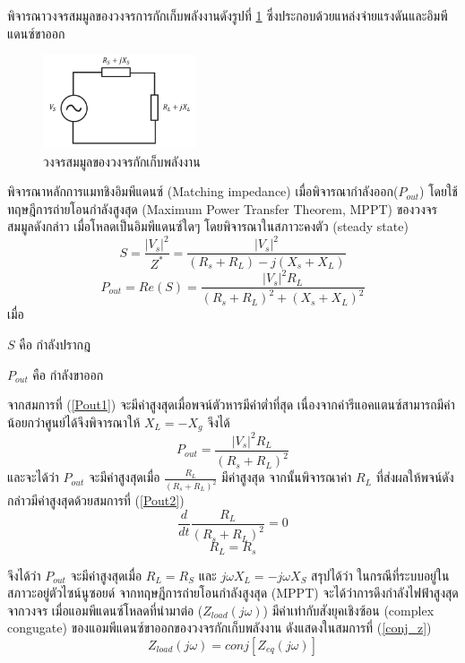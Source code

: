 \documentclass[11pt,a4paper]{article}
\begin{document}
พิจารณาวงจรสมมูลของวงจรการกักเก็บพลังงานดังรูปที่ \ref{genpath_elec_cir} ซึ่งประกอบด้วยแหล่งจ่ายแรงดันและอิมพีแดนซ์ขาออก
\begin{figure}[H]
    \begin{center}
        \includegraphics[width=0.4\textwidth]{genpath_elec_cir.jpg}
    \end{center}
    \caption{วงจรสมมูลของวงจรกักเก็บพลังงาน \cite{MPPT}}
    \label{genpath_elec_cir}
\end{figure}
พิจารณาหลักการแมทชิงอิมพีแดนซ์ (Matching impedance) เมื่อพิจารณากำลังออก($P_{out}$) โดยใช้ทฤษฎีการถ่ายโอนกำลังสูงสุด (Maximum Power Transfer Theorem, MPPT) ของวงจรสมมูลดังกล่าว เมื่อโหลดเป็นอิมพีแดนซ์ใดๆ โดยพิจารณาในสภาวะคงตัว (steady state)
\begin{equation}
    S = \frac{|V_{s}|^2 }{ Z^{*} } = \frac{|V_{s}|^2 }{ (R_{s} + R_{L}) - j(X_{s} + X_{L} )  }
\end{equation}
\begin{equation}\label{Pout1}
    P_{out} = Re(S) = \frac{|V_{s}|^2 R_{L} }{ (R_{s} + R_{L})^2 + (X_{s} + X_{L} )^2  }
\end{equation}
เมื่อ

$S$ คือ กำลังปรากฎ

$P_{out}$ คือ กำลังขาออก

จากสมการที่ ({\ref{Pout1}}) จะมีค่าสูงสุดเมื่อพจน์ตัวหารมีค่าต่ำที่สุด เนื่องจากค่ารีแอคแตนซ์สามารถมีค่าน้อยกว่าศูนย์ได้จึงพิจารณาให้ $X_{L} = - X_{g}$ จึงได้
\begin{equation}
    P_{out}  = \frac{|V_{s}|^2 R_{L} }{ (R_{s} + R_{L})^2 }
\end{equation}
และจะได้ว่า $P_{out}$ จะมีค่าสูงสุดเมื่อ $\frac{ R_{L} }{ (R_{s} + R_{L})^2 }$ มีค่าสูงสุด จากนั้นพิจารณาค่า $R_{L}$ ที่ส่งผลให้พจน์ดังกล่าวมีค่าสูงสุดด้วยสมการที่ (\ref{Pout2})
\begin{equation}\label{Pout2}
    \frac{d}{dt} \frac{ R_{L} }{ (R_{s} + R_{L})^2 } = 0
\end{equation}
\begin{equation}
     R_{L} = R_{s} 
\end{equation}

จึงได้ว่า $P_{out}$ จะมีค่าสูงสุดเมื่อ $R_{L} = R_{S}$ และ $j\omega X_{L} = -j\omega X_{S}$ 
สรุปได้ว่า ในกรณีที่ระบบอยู่ในสภาวะอยู่ตัวไซน์นูซอยด์ จากทฤษฎีการถ่ายโอนกำลังสูงสุด (MPPT) จะได้ว่าการดึงกำลังไฟฟ้าสูงสุดจากวงจร 
เมื่อแอมพีแดนซ์โหลดที่นำมาต่อ ($Z_{load}(j\omega)$) มีค่าเท่ากับสังยุคเชิงซ้อน (complex congugate) ของแอมพีแดนซ์ขาออกของวงจรกักเก็บพลังงาน ดังแสดงในสมการที่ (\ref{conj_z}) 
\begin{equation} \label{conj_z}
    Z_{load}(j\omega) = conj[Z_{eq}(j\omega)] 
\end{equation}
\end{document}
